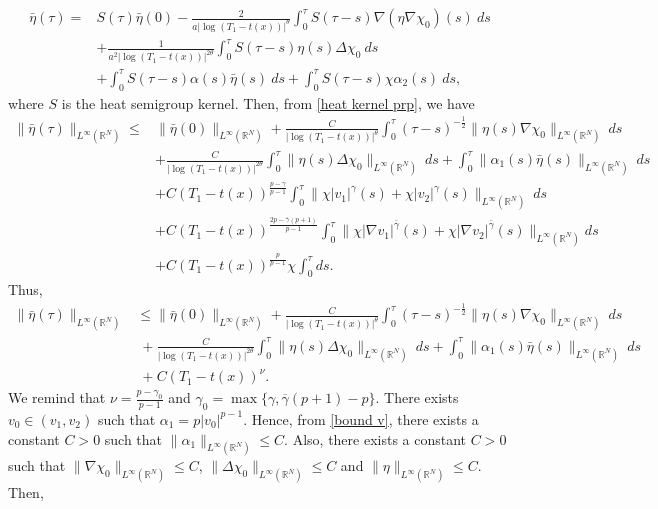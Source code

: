 \documentclass[11pt,a4paper]{article}
\newcommand{\1}{\mathbbm{1}}
\numberwithin{equation}{section}
\newcommand{\numberset}{\mathbb}
\newcommand{\R}{\numberset{R}}
\theoremstyle{remark}
\begin{document}
\begin{equation*}
\begin{split}
\bar{\eta}(\tau)=&S(\tau) \bar{\eta}(0)-\frac{2}{a|\log (T_1-t(x))|^{\theta}}\int^\tau_0S(\tau-s)\nabla(\eta\nabla \chi_0)(s)\ ds\\
&+\frac{1}{a^2|\log (T_1-t(x))|^{2\theta}}\int^\tau_0S(\tau-s)\eta(s) \Delta \chi_0\ ds\\
&+\int^\tau_0 S(\tau-s)\alpha(s)\bar{\eta}(s)\ ds+\int^\tau_0 S(\tau-s)\chi\alpha_2(s)\ ds,
\end{split}
\end{equation*}
where $S$ is the heat semigroup kernel. Then, from \eqref{heat kernel prp}, we have
\begin{equation*}
\begin{split}
\|\bar{\eta}(\tau)\|_{L^\infty(\R^N)}\leq&\|\bar{\eta}(0)\|_{L^\infty(\R^N)}+\frac{C}{|\log (T_1-t(x))|^{\theta}}\int^\tau_0(\tau-s)^{-\frac{1}{2}}\|\eta(s)\nabla \chi_0\|_{L^\infty(\R^N)}\ ds\\
&+\frac{C}{|\log (T_1-t(x))|^{2\theta}}\int^\tau_0\|\eta (s) \Delta \chi_0\|_{L^\infty(\R^N)}\ ds+\int^\tau_0 \|\alpha_1(s)\bar{\eta}(s)\|_{L^\infty(\R^N)}\ ds\\
&+C(T_1-t(x))^{\frac{p-\gamma}{p-1}}\int^\tau_0 \|\chi|v_1|^{\gamma}(s)+\chi|v_2|^{\gamma}(s)\|_{L^\infty(\R^N)}\ ds\\
&+C(T_1-t(x))^{\frac{2p-\bar \gamma(p+1)}{p-1}}\int^\tau_0\|\chi|\nabla v_1|^{\bar\gamma}(s)+\chi|\nabla v_2|^{\bar\gamma}(s)\|_{L^\infty(\R^N)}ds\\
&+C(T_1-t(x))^{\frac{p}{p-1}}\chi\int^\tau_0ds.
\end{split}
\end{equation*}
Thus, 
\begin{equation*}
\begin{split}
\|\bar{\eta}(\tau)\|_{L^\infty(\R^N)}&\leq\|\bar{\eta}(0)\|_{L^\infty(\R^N)}+\frac{C}{|\log (T_1-t(x))|^{\theta}}\int^\tau_0(\tau-s)^{-\frac{1}{2}}\|\eta (s)\nabla \chi_0\|_{L^\infty(\R^N)}\ ds\\
&\ +\frac{C}{|\log (T_1-t(x))|^{2\theta}}\int^\tau_0\|\eta (s)\Delta \chi_0\|_{L^\infty(\R^N)}\ ds+\int^\tau_0 \|\alpha_1(s)\bar{\eta}(s)\|_{L^\infty(\R^N)}\ ds\\
&\ +C(T_1-t(x))^{\nu }.
\end{split}
\end{equation*}
We remind that $\nu=\frac{p-\gamma_0}{p-1}$ and $\gamma_0=\max\{\gamma,\overline{\gamma}(p+1)-p\}$. There exists $v_0\in (v_1,v_2)$ such that $\alpha_1=p|v_0|^{p-1}$. Hence, from \eqref{bound v}, there exists a constant $C>0$ such that $\|\alpha_1\|_{L^\infty(\R^N)}\leq C$. Also, there exists a constant $C>0$ such that $\|\nabla \chi_0\|_{L^\infty(\R^N)}\leq C$, $\|\Delta \chi_0\|_{L^\infty(\R^N)}\leq C$ and $\|\eta\|_{L^\infty(\R^N)}\leq C$. Then,
\end{document}
